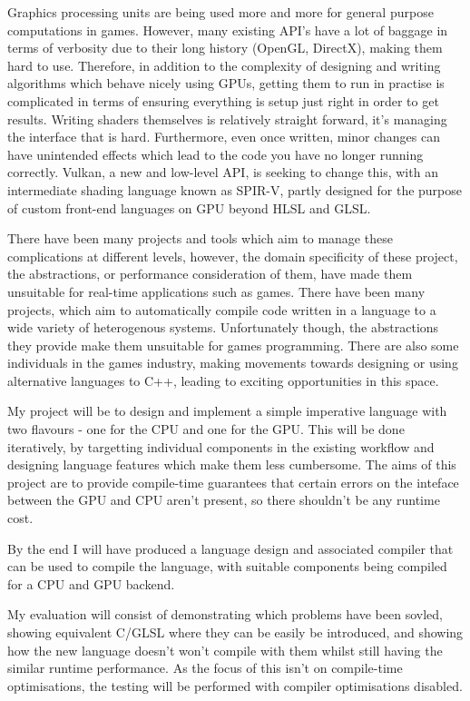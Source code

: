 \documentclass[11pt]{article}
\begin{document}
Graphics processing units are being used more and more for general purpose
computations in games. However, many existing API’s have a lot of baggage in
terms of verbosity due to their long history (OpenGL, DirectX), making them
hard to use. Therefore, in addition to the complexity of designing and writing
algorithms which behave nicely using GPUs, getting them to run in practise is
complicated in terms of ensuring everything is setup just right in order to get
results. Writing shaders themselves is relatively straight forward, it's
managing the interface that is hard. Furthermore, even once written, minor
changes can have unintended effects which lead to the code you have no longer
running correctly. Vulkan, a new and low-level API, is seeking to change this,
with an intermediate shading language known as SPIR-V, partly designed for the
purpose of custom front-end languages on GPU beyond HLSL and GLSL.

There have been many projects and tools which aim to manage these complications
at different levels, however, the domain specificity of these project, the
abstractions, or performance consideration of them, have made them unsuitable
for real-time applications such as games. There have been many projects, which
aim to automatically compile code written in a language to a wide variety of
heterogenous systems. Unfortunately though, the abstractions they provide make
them unsuitable for games programming. There are also some individuals in the
games industry, making movements towards designing or using alternative
languages to C++, leading to exciting opportunities in this space.

My project will be to design and implement a simple imperative language with
two flavours - one for the CPU and one for the GPU. This will be done
iteratively, by targetting individual components in the existing workflow and
designing language features which make them less cumbersome. The aims of this
project are to provide compile-time guarantees that certain errors on the
inteface between the GPU and CPU aren't present, so there shouldn't be any
runtime cost.

By the end I will have produced a language design and associated compiler that
can be used to compile the language, with suitable components being compiled for
a CPU and GPU backend.

My evaluation will consist of demonstrating which problems have been sovled,
showing equivalent C/GLSL where they can be easily be introduced, and showing
how the new language doesn't won't compile with them whilst still having the
similar runtime performance. As the focus of this isn't on compile-time
optimisations, the testing will be performed with compiler optimisations
disabled.
\end{document}
